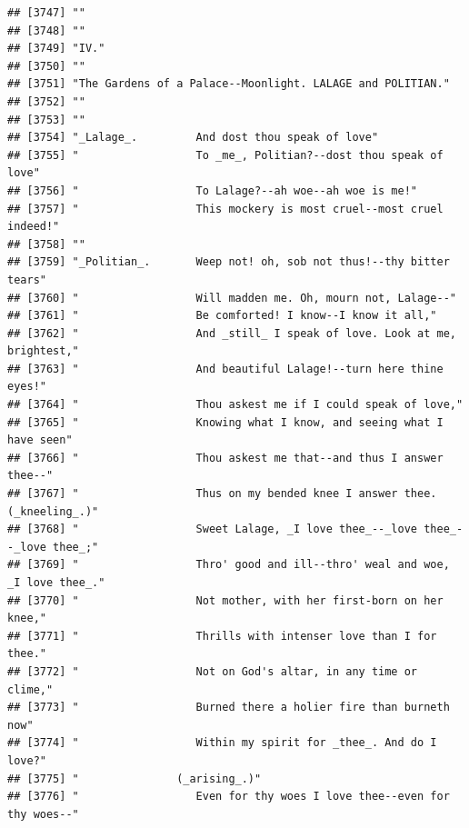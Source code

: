 \documentclass{article}\usepackage[]{graphicx}\usepackage[]{color}
\makeatletter
\newenvironment{kframe}{%
 \def\at@end@of@kframe{}%
 \ifinner\ifhmode%
  \def\at@end@of@kframe{\end{minipage}}%
  \begin{minipage}{\columnwidth}%
 \fi\fi%
 \def\FrameCommand##1{\hskip\@totalleftmargin \hskip-\fboxsep
 \colorbox{shadecolor}{##1}\hskip-\fboxsep
     \hskip-\linewidth \hskip-\@totalleftmargin \hskip\columnwidth}%
 \MakeFramed {\advance\hsize-\width
   \@totalleftmargin\z@ \linewidth\hsize
   \@setminipage}}%
 {\par\unskip\endMakeFramed%
 \at@end@of@kframe}
\newenvironment{knitrout}{}{} %
\makeatother
\begin{document}
\begin{knitrout}
\begin{kframe}
\begin{verbatim}
## [3747] ""                                                                            
## [3748] ""                                                                            
## [3749] "IV."                                                                         
## [3750] ""                                                                            
## [3751] "The Gardens of a Palace--Moonlight. LALAGE and POLITIAN."                    
## [3752] ""                                                                            
## [3753] ""                                                                            
## [3754] "_Lalage_.         And dost thou speak of love"                               
## [3755] "                  To _me_, Politian?--dost thou speak of love"               
## [3756] "                  To Lalage?--ah woe--ah woe is me!"                         
## [3757] "                  This mockery is most cruel--most cruel indeed!"            
## [3758] ""                                                                            
## [3759] "_Politian_.       Weep not! oh, sob not thus!--thy bitter tears"             
## [3760] "                  Will madden me. Oh, mourn not, Lalage--"                   
## [3761] "                  Be comforted! I know--I know it all,"                      
## [3762] "                  And _still_ I speak of love. Look at me, brightest,"       
## [3763] "                  And beautiful Lalage!--turn here thine eyes!"              
## [3764] "                  Thou askest me if I could speak of love,"                  
## [3765] "                  Knowing what I know, and seeing what I have seen"          
## [3766] "                  Thou askest me that--and thus I answer thee--"             
## [3767] "                  Thus on my bended knee I answer thee. (_kneeling_.)"       
## [3768] "                  Sweet Lalage, _I love thee_--_love thee_--_love thee_;"    
## [3769] "                  Thro' good and ill--thro' weal and woe, _I love thee_."    
## [3770] "                  Not mother, with her first-born on her knee,"              
## [3771] "                  Thrills with intenser love than I for thee."               
## [3772] "                  Not on God's altar, in any time or clime,"                 
## [3773] "                  Burned there a holier fire than burneth now"               
## [3774] "                  Within my spirit for _thee_. And do I love?"               
## [3775] "               (_arising_.)"                                                 
## [3776] "                  Even for thy woes I love thee--even for thy woes--"        

\end{verbatim}
\end{kframe}
\end{knitrout}
\end{document}
